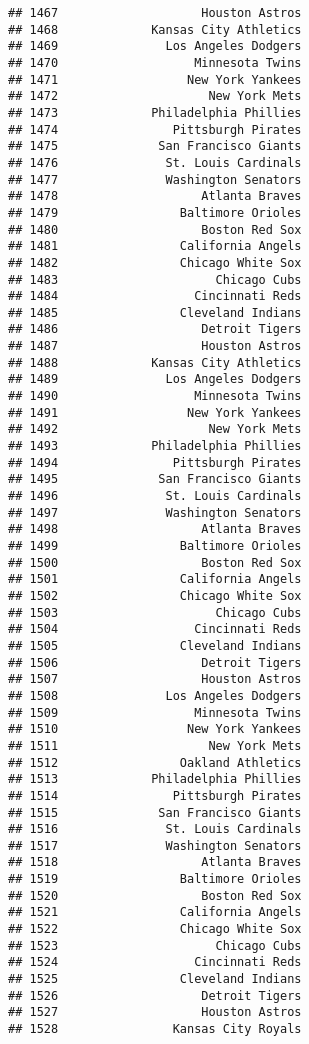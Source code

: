 \documentclass[]{article}
\begin{document}
\begin{verbatim}
## 1467                    Houston Astros
## 1468             Kansas City Athletics
## 1469               Los Angeles Dodgers
## 1470                   Minnesota Twins
## 1471                  New York Yankees
## 1472                     New York Mets
## 1473             Philadelphia Phillies
## 1474                Pittsburgh Pirates
## 1475              San Francisco Giants
## 1476               St. Louis Cardinals
## 1477               Washington Senators
## 1478                    Atlanta Braves
## 1479                 Baltimore Orioles
## 1480                    Boston Red Sox
## 1481                 California Angels
## 1482                 Chicago White Sox
## 1483                      Chicago Cubs
## 1484                   Cincinnati Reds
## 1485                 Cleveland Indians
## 1486                    Detroit Tigers
## 1487                    Houston Astros
## 1488             Kansas City Athletics
## 1489               Los Angeles Dodgers
## 1490                   Minnesota Twins
## 1491                  New York Yankees
## 1492                     New York Mets
## 1493             Philadelphia Phillies
## 1494                Pittsburgh Pirates
## 1495              San Francisco Giants
## 1496               St. Louis Cardinals
## 1497               Washington Senators
## 1498                    Atlanta Braves
## 1499                 Baltimore Orioles
## 1500                    Boston Red Sox
## 1501                 California Angels
## 1502                 Chicago White Sox
## 1503                      Chicago Cubs
## 1504                   Cincinnati Reds
## 1505                 Cleveland Indians
## 1506                    Detroit Tigers
## 1507                    Houston Astros
## 1508               Los Angeles Dodgers
## 1509                   Minnesota Twins
## 1510                  New York Yankees
## 1511                     New York Mets
## 1512                 Oakland Athletics
## 1513             Philadelphia Phillies
## 1514                Pittsburgh Pirates
## 1515              San Francisco Giants
## 1516               St. Louis Cardinals
## 1517               Washington Senators
## 1518                    Atlanta Braves
## 1519                 Baltimore Orioles
## 1520                    Boston Red Sox
## 1521                 California Angels
## 1522                 Chicago White Sox
## 1523                      Chicago Cubs
## 1524                   Cincinnati Reds
## 1525                 Cleveland Indians
## 1526                    Detroit Tigers
## 1527                    Houston Astros
## 1528                Kansas City Royals

\end{verbatim}
\end{document}
